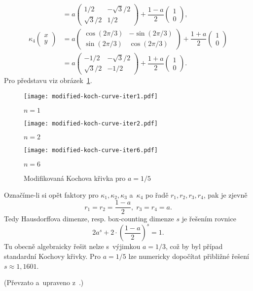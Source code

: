 \begin{example}
\begin{align*}
        &=a\left(\begin{matrix}
            1/2 & -\sqrt{3}/2\\
            \sqrt{3}/2 & 1/2
        \end{matrix}\right)+\dfrac{1-a}{2}\left(\begin{matrix}
            1\\
            0
        \end{matrix}\right),\\
        \kappa_4\left(\begin{matrix}
            x\\
            y
        \end{matrix}\right)&=a\left(\begin{matrix}
            \cos(2\pi/3) & -\sin(2\pi/3)\\
            \sin(2\pi/3) & \cos(2\pi/3)
        \end{matrix}\right)+\dfrac{1+a}{2}\left(\begin{matrix}
            1\\
            0
        \end{matrix}\right)\\
        &=a\left(\begin{matrix}
            -1/2 & -\sqrt{3}/2\\
            \sqrt{3}/2 & -1/2
        \end{matrix}\right)+\dfrac{1+a}{2}\left(\begin{matrix}
            1\\
            0
        \end{matrix}\right).
    \end{align*}
    Pro představu viz obrázek~\ref{fig:modifikovana-kochova-krivka}.
    \begin{figure}[h]
        \centering
        \texttt{[image: modified-koch-curve-iter1.pdf]}
        \begin{center}
            $n=1$
        \end{center}
        \texttt{[image: modified-koch-curve-iter2.pdf]}
        \begin{center}
            $n=2$
        \end{center}
        \texttt{[image: modified-koch-curve-iter6.pdf]}
        \begin{center}
            $n=6$
        \end{center}
        \caption{Modifikovaná Kochova křivka pro $a=1/5$}
        \label{fig:modifikovana-kochova-krivka}
    \end{figure}
    Označíme-li si opět faktory pro $\kappa_1,\kappa_2,\kappa_3$ a~$\kappa_4$ po řadě $r_1,r_2,r_3,r_4$, pak je zjevně
    \[r_1=r_2=\dfrac{1-a}{2},\;r_3=r_4=a.\]
    Tedy Hausdorffova dimenze, resp. box-counting dimenze $s$ je řešením rovnice
    \[2a^s+2\cdot\left(\dfrac{1-a}{2}\right)^s=1.\]
    Tu obecně algebraicky řešit nelze s~výjimkou $a=1/3$, což by byl případ standardní Kochovy křivky. Pro $a=1/5$ lze numericky dopočítat přibližné řešení $s\approx 1{,}1601$.
\end{example}
(Převzato a~upraveno z~\citep[str. 142]{Falconer1989}.)

